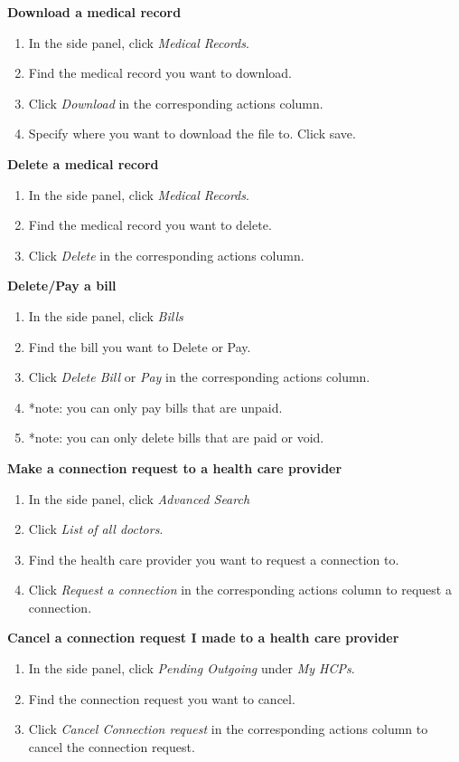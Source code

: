 \documentclass[12pt]{report}
\begin{document}
\textbf{Download a medical record}
\begin{enumerate}
\item In the side panel, click \textit{Medical Records}.
\item Find the medical record you want to download.
\item Click \textit{Download} in the corresponding actions column.
\item Specify where you want to download the file to. Click save.
\end{enumerate}
\textbf{Delete a medical record}
\begin{enumerate}
\item In the side panel, click \textit{Medical Records}.
\item Find the medical record you want to delete.
\item Click \textit{Delete} in the corresponding actions column.
\end{enumerate}
\textbf{Delete/Pay a bill}
\begin{enumerate}
\item In the side panel, click \textit{Bills}
\item Find the bill you want to Delete or Pay.
\item Click \textit{Delete Bill} or \textit{Pay} in the corresponding actions column.
\item *note: you can only pay bills that are unpaid.
\item *note: you can only delete bills that are paid or void.
\end{enumerate}
\textbf{Make a connection request to a health care provider}
\begin{enumerate}
\item In the side panel, click \textit{Advanced Search}
\item Click \textit{List of all doctors}.
\item Find the health care provider you want to request a connection to.
\item Click \textit{Request a connection} in the corresponding actions column to request a connection.
\end{enumerate}
\textbf{Cancel a connection request I made to a health care provider}
\begin{enumerate}
\item In the side panel, click \textit{Pending Outgoing} under \textit{My HCPs}.
\item Find the connection request you want to cancel.
\item Click \textit{Cancel Connection request} in the corresponding actions column to cancel the connection request.
\end{enumerate}
\end{document}
